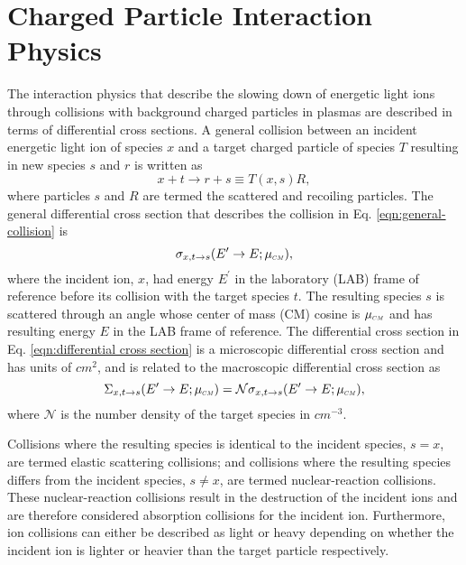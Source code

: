 \documentclass[../main.tex]{subfiles}
\begin{document}
\chapter{Charged Particle Interaction Physics}
The interaction physics that describe the slowing down of energetic light ions through collisions with background charged particles in plasmas are described in terms of differential cross sections. A general collision between an incident energetic light ion of species $x$ and a target charged particle of species $T$ resulting in new species $s$ and $r$ is written as
\begin{equation} \label{eqn:general-collision}
    x+t \rightarrow r+s \equiv T(x,s)R,
\end{equation}
where particles $s$ and $R$ are termed the scattered and recoiling particles. The general differential cross section that describes the collision in Eq. \eqref{eqn:general-collision} is
\begin{equation} \label{eqn:differential cross section}
    \sigma_{x,t \rightarrow s}(E^{\prime} \rightarrow E; \mucm),
\end{equation}
where the incident ion, $x$, had energy $E^{\prime}$ in the laboratory (LAB) frame of reference before its collision with the target species $t$. The resulting species $s$ is scattered through an angle whose center of mass (CM) cosine is $\mucm$ and has resulting energy $E$ in the LAB frame of reference. The differential cross section in Eq. \eqref{eqn:differential cross section} is a microscopic differential cross section and has units of $cm^{2}$, and is related to the macroscopic differential cross section as
\begin{equation}
    \Sigma_{x,t \rightarrow s}(E^{\prime} \rightarrow E; \mucm) = \mathcal{N} \sigma_{x,t \rightarrow s}(E^{\prime} \rightarrow E; \mucm),
\end{equation}
where $\mathcal{N}$ is the number density of the target species in $cm^{-3}$.

Collisions where the resulting species is identical to the incident species, $s = x$, are termed elastic scattering collisions; and collisions where the resulting species differs from the incident species, $s \neq x$, are termed nuclear-reaction collisions. These nuclear-reaction collisions result in the destruction of the incident ions and are therefore considered absorption collisions for the incident ion. Furthermore, ion collisions can either be described as light or heavy depending on whether the incident ion is lighter or heavier than the target particle respectively. 
\end{document}
